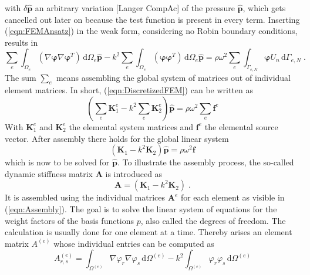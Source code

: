 \documentclass[%
  a4paper,oneside,%
  11pt,%
  smallchapters,
  style=printdev,
  extramargin,
  green,%
  rgb, <cmyk>
  ]{tubsbook}
\begin{document}
with $\delta\hat{\bm{p}}$ an arbitrary variation [Langer CompAc] of the pressure $\hat{\bm{p}}$, which gets cancelled out later on because the test function is present in every term.
Inserting (\ref{eqn:FEMAnsatz}) in the weak form, considering no Robin boundary conditions, results in
\begin{equation}
\sum_e \int_{\Omega_e} (\nabla \bm{\varphi} \nabla \bm{\varphi}^T)\,\mathrm{d}\Omega_e \hat{\bm{p}} -k^2 \sum_e \int_{\Omega_e} (\bm{\varphi} \bm{\varphi}^T)\,\mathrm{d}\Omega_e \hat{\bm{p}} = \rho \omega^2 \sum_e \int_{\Gamma_{e,N}} \bm{\varphi} U_n \,\mathrm{d}\Gamma_{e,N} \;.
\label{eqn:DiscretizedFEM}
\end{equation}
The sum $\sum_e$ means assembling the global system of matrices out of individual element matrices. In short, (\ref{eqn:DiscretizedFEM}) can be written as
\begin{equation}
\left( \sum_e \bm{K}_1^e - k^2 \sum_e \bm{K}_2^e \right)\hat{\bm{p}} = \rho \omega^2 \sum_e \bm{f}^e
\end{equation}
With $\bm{K}_1^e$ and $\bm{K}_2^e$ the elemental system matrices and $\bm{f}^e$ the elemental source vector. After assembly there holds for the global linear system
\begin{equation}
(\bm{K}_1 - k^2 \bm{K}_2) \hat{\bm{p}} = \rho \omega^2 \bm{f}
\label{eqn:LinSys}
\end{equation}
which is now to be solved for $\hat{\bm{p}}$.
To illustrate the assembly process, the so-called dynamic stiffness matrix $\bm{A}$ is introduced as
\begin{equation}
\bm{A} = (\bm{K}_1 - k^2 \bm{K}_2) \;.
\end{equation}
It is assembled using the individual matrices $\bm{A}^e$ for each element as visible in (\ref{eqn:Assembly}).
The goal is to solve the linear system of equations for the weight factors of the basis functions $p$, also called the degrees of freedom.
The calculation is usually done for one element at a time. Thereby arises an element matrix $A^{(e)}$ whose individual entries can be computed as
\begin{equation}
A_{r,s}^{(e)} = \int_{\Omega^{(e)}} \nabla \varphi_r \nabla \varphi_s \, \mathrm{d}\Omega^{(e)} - k^2 \int_{\Omega^{(e)}} \varphi_r \varphi_s \, \mathrm{d}\Omega^{(e)}
\end{equation}
\end{document}
